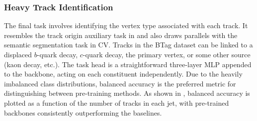 \subsubsection{Heavy Track Identification}

The final task involves identifying the vertex type associated with each track.
It resembles the track origin auxiliary task in  and also draws parallels with the semantic segmentation task in CV.
Tracks in the BTag dataset can be linked to a displaced $b$-quark decay, $c$-quark decay, the primary vertex, or some other source (kaon decay, etc.).
The task head is a straightforward three-layer MLP appended to the backbone, acting on each constituent independently.
Due to the heavily imbalanced class distributions, balanced accuracy is the preferred metric for distinguishing between pre-training methods.
As shown in , balanced accuracy is plotted as a function of the number of tracks in each jet, with pre-trained backbones consistently outperforming the baselines.

